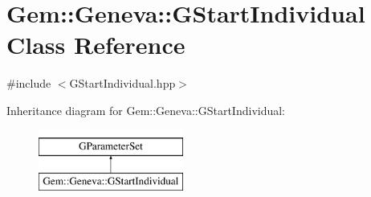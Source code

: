 \hypertarget{class_gem_1_1_geneva_1_1_g_start_individual}{\section{Gem\-:\-:Geneva\-:\-:G\-Start\-Individual Class Reference}
\label{class_gem_1_1_geneva_1_1_g_start_individual}
}


{\ttfamily \#include $<$G\-Start\-Individual.\-hpp$>$}

Inheritance diagram for Gem\-:\-:Geneva\-:\-:G\-Start\-Individual\-:\begin{figure}[H]
\begin{center}
\leavevmode
\includegraphics[height=2.000000cm]{class_gem_1_1_geneva_1_1_g_start_individual}
\end{center}
\end{figure}
